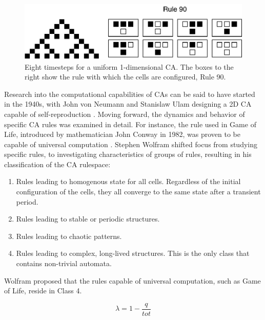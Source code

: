 \begin{figure}[ht]
  \centering
  \includegraphics[width=0.6\linewidth]{fig/ca-example}
  \caption{
    Eight timesteps for a uniform 1-dimensional CA. The boxes to the right show
    the rule with which the cells are configured, Rule 90.
  }
  \label{fig:ca-example}
\end{figure}

Research into the computational capabilities of CAs can be said to have started
in the 1940s, with John von Neumann and Stanislaw Ulam designing a 2D CA capable
of self-reproduction \cite{Sipper1999}. Moving forward, the dynamics and
behavior of specific CA rules was examined in detail. For instance, the rule
used in Game of Life, introduced by mathematician John Conway in 1982, was
proven to be capable of universal computation \cite{Connelly1986}. Stephen
Wolfram shifted focus from studying specific rules, to investigating
characteristics of groups of rules, resulting in his classification of the CA
rulespace:

\begin{enumerate}
  \item Rules leading to homogenous state for all cells. Regardless of the
    initial configuration of the cells, they all converge to the same state
    after a transient period.
  \item Rules leading to stable or periodic structures.
  \item Rules leading to chaotic patterns.
  \item Rules leading to complex, long-lived structures. This is the only class
    that contains non-trivial automata.
\end{enumerate}

Wolfram proposed that the rules capable of universal computation, such as Game
of Life, reside in Class 4.

\begin{equation}
  \label{eqn:lambda}
  \lambda = 1 - \frac{q}{tot}
\end{equation}

